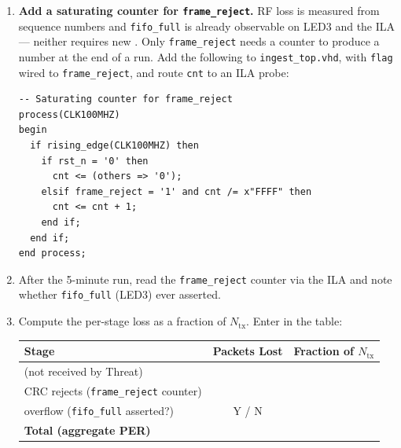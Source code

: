 \documentclass[11pt,letterpaper]{article}
\begin{document}
\begin{enumerate}[leftmargin=2em]
	\item \textbf{Add a saturating counter for \texttt{frame\_reject}.} RF loss is measured from sequence numbers and \texttt{fifo\_full} is already observable on LED3 and the ILA --- neither requires new \RTL{}. Only \texttt{frame\_reject} needs a counter to produce a number at the end of a run. Add the following to \texttt{ingest\_top.vhd}, with \texttt{flag} wired to \texttt{frame\_reject}, and route \texttt{cnt} to an \mbox{ILA} probe:

\begin{verbatim}
-- Saturating counter for frame_reject
process(CLK100MHZ)
begin
  if rising_edge(CLK100MHZ) then
    if rst_n = '0' then
      cnt <= (others => '0');
    elsif frame_reject = '1' and cnt /= x"FFFF" then
      cnt <= cnt + 1;
    end if;
  end if;
end process;
\end{verbatim}

	\item After the 5-minute run, read the \texttt{frame\_reject} counter via the \mbox{ILA} and note whether \texttt{fifo\_full} (LED3) ever asserted.
	\item Compute the per-stage loss as a fraction of $N_{\text{tx}}$. Enter in the table:
	\begin{center}
		\begin{tabular}{l c c}
			\toprule
			\textbf{Stage} & \textbf{Packets Lost} & \textbf{Fraction of $N_{\text{tx}}$} \\
			\midrule
			\RF{} (not received by Threat) & & \\
			\mbox{CRC} rejects (\texttt{frame\_reject} counter) & & \\
			\FIFO{} overflow (\texttt{fifo\_full} asserted?) & Y / N & \\
			\midrule
			\textbf{Total (aggregate PER)} & & \\
			\bottomrule
		\end{tabular}
	\end{center}
\end{enumerate}
\end{document}
